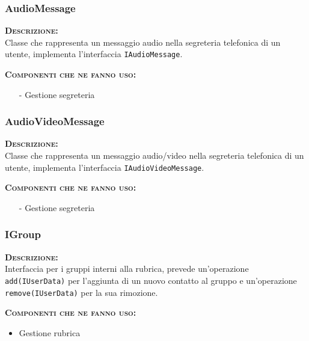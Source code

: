 \subsubsection{AudioMessage}
\begin{description}
	\item{\scshape\bfseries Descrizione:}\\
Classe che rappresenta un messaggio audio nella segreteria telefonica di un utente, implementa l'interfaccia \texttt{IAudioMessage}.
	\item{\scshape\bfseries Componenti che ne fanno uso:}
	  \begin{itemize}
	    \item[-] Gestione segreteria
	  \end{itemize}
\end{description}

\subsubsection{AudioVideoMessage}
\begin{description}
	\item{\scshape\bfseries Descrizione:}\\
Classe che rappresenta un messaggio audio/video nella segreteria telefonica di un utente, implementa l'interfaccia \texttt{IAudioVideoMessage}.
	\item{\scshape\bfseries Componenti che ne fanno uso:}
	  \begin{itemize}
	    \item[-] Gestione segreteria
	  \end{itemize}
\end{description}

\subsubsection{IGroup}
\begin{description}
	\item{\scshape\bfseries Descrizione:}\\
Interfaccia per i gruppi interni alla rubrica, prevede un'operazione \texttt{add(IUserData)} per l'aggiunta di un nuovo contatto al gruppo e un'operazione \texttt{remove(IUserData)} per la sua rimozione.
	\item{\scshape\bfseries Componenti che ne fanno uso:} 
	  \begin{itemize}
	    \item Gestione rubrica
	  \end{itemize}
\end{description}


